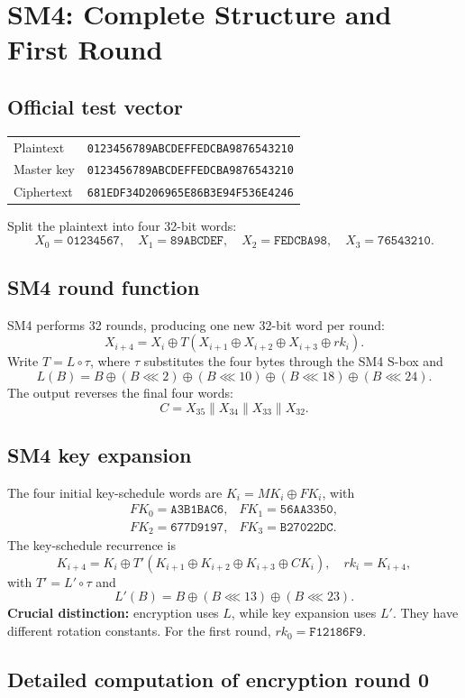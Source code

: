 \documentclass[11pt,a4paper]{report}
\newcommand{\hex}[1]{\texttt{#1}}
\newcommand{\xor}{\mathbin{\oplus}}
\newcommand{\rol}{\mathbin{\lll}}
\begin{document}
\chapter{SM4: Complete Structure and First Round}
\section{Official test vector}
\begin{center}\begin{tabular}{ll}\toprule Plaintext&\hex{0123456789ABCDEFFEDCBA9876543210}\\Master key&\hex{0123456789ABCDEFFEDCBA9876543210}\\Ciphertext&\hex{681EDF34D206965E86B3E94F536E4246}\\\bottomrule\end{tabular}\end{center}
Split the plaintext into four 32-bit words:
\[X_0=\hex{01234567},\quad X_1=\hex{89ABCDEF},\quad X_2=\hex{FEDCBA98},\quad X_3=\hex{76543210}.\]
\section{SM4 round function}
SM4 performs 32 rounds, producing one new 32-bit word per round:
\[\boxed{X_{i+4}=X_i\xor T(X_{i+1}\xor X_{i+2}\xor X_{i+3}\xor rk_i)}.\]
Write \(T=L\circ\tau\), where \(\tau\) substitutes the four bytes through the SM4 S-box and
\[L(B)=B\xor(B\rol2)\xor(B\rol10)\xor(B\rol18)\xor(B\rol24).\]
The output reverses the final four words:
\[C=X_{35}\parallel X_{34}\parallel X_{33}\parallel X_{32}.\]
\section{SM4 key expansion}
The four initial key-schedule words are \(K_i=MK_i\xor FK_i\), with
\[\begin{array}{ll}FK_0=\hex{A3B1BAC6},&FK_1=\hex{56AA3350},\\FK_2=\hex{677D9197},&FK_3=\hex{B27022DC}.\end{array}\]
The key-schedule recurrence is
\[K_{i+4}=K_i\xor T'(K_{i+1}\xor K_{i+2}\xor K_{i+3}\xor CK_i),\quad rk_i=K_{i+4},\]
with \(T'=L'\circ\tau\) and
\[L'(B)=B\xor(B\rol13)\xor(B\rol23).\]
\textbf{Crucial distinction:} encryption uses \(L\), while key expansion uses \(L'\). They have different rotation constants.
For the first round, \(rk_0=\hex{F12186F9}\).
\section{Detailed computation of encryption round 0}
\end{document}
